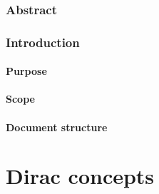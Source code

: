 
\section{Abstract}

\section{Introduction}
\subsection{Purpose}
\subsection{Scope}
\subsection{Document structure}

\part{Dirac concepts}

